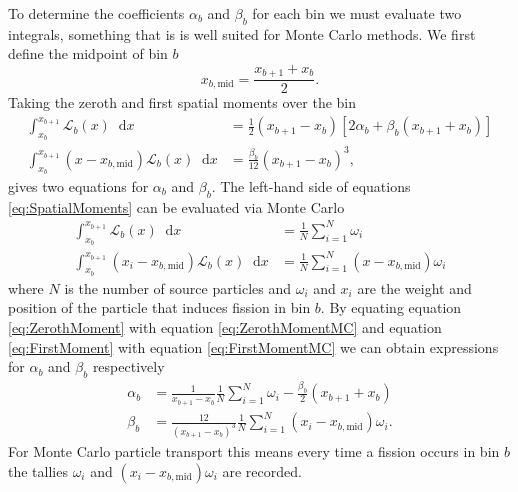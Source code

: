 \documentclass[12]{ansnse}
\newcommand{\dd}{\ensuremath{\mathop{}\!\mathrm{d}}}
\newcommand{\Lx}{\ensuremath{\Lin_b(x)}}
\newcommand{\Lin}{\ensuremath{\mathcal{L}}}
\newcommand{\xmid}{\ensuremath{x_{b,\mathrm{mid}}}}
\begin{document}
\begin{doublespace}
To determine the coefficients $\alpha_b$ and $\beta_b$ for each bin we must evaluate two integrals, something that is is well suited for Monte Carlo methods.  We first define the midpoint of bin $b$
\begin{equation}
    \xmid = \frac{x_{b+1}+x_b}{2}.
    \label{eq:xmid}
\end{equation}
Taking the zeroth and first spatial moments over the bin
\begin{subequations}
    \begin{align}
        \int_{x_b}^{x_{b+1}} \Lx \dd x &= \frac{1}{2}\left(x_{b+1} - x_b\right)\left[2\alpha_b + \beta_b\left(x_{b+1} + x_b\right)\right] \label{eq:ZerothMoment} \\
        \int_{x_b}^{x_{b+1}} \left(x-\xmid\right)\Lx \dd x &= \frac{\beta_b}{12}\left(x_{b+1} - x_b\right)^3, \label{eq:FirstMoment}
    \end{align}
        \label{eq:SpatialMoments}
\end{subequations}
gives two equations for $\alpha_b$ and $\beta_b$.  The left-hand side of equations \ref{eq:SpatialMoments} can be evaluated via Monte Carlo
\begin{subequations}\label{eq:SpatialMomentsMC}
    \begin{align}
        \int_{x_b}^{x_{b+1}} \Lx \dd x &= \frac{1}{N}\sum_{i=1}^N \omega_i  \label{eq:ZerothMomentMC} \\
        \int_{x_b}^{x_{b+1}} \left(x_i-\xmid\right)\Lx \dd x &= \frac{1}{N}\sum_{i=1}^N \left(x-\xmid\right)\omega_i \label{eq:FirstMomentMC}
    \end{align}
\end{subequations}
where $N$ is the number of source particles and $\omega_i$ and $x_i$ are the weight and position of the particle that induces fission in bin $b$.  By equating equation \ref{eq:ZerothMoment} with equation \ref{eq:ZerothMomentMC} and equation \ref{eq:FirstMoment} with equation \ref{eq:FirstMomentMC} we can obtain expressions for $\alpha_b$ and $\beta_b$ respectively
\begin{subequations}
    \begin{align}
        \alpha_b &= \frac{1}{x_{b+1}-x_b}\frac{1}{N} \sum_{i=1}^N \omega_i - \frac{\beta_b}{2}\left(x_{b+1}+x_b\right) \label{eq:alpha_b} \\
        \beta_b &= \frac{12}{\left(x_{b+1}-x_b\right)^3}\frac{1}{N} \sum_{i=1}^N \left(x_i-\xmid\right)\omega_i. \label{eq:beta_b}
    \end{align}
    \label{eq:ExpansionCoefficients}
\end{subequations}
For Monte Carlo particle transport this means every time a fission occurs in bin $b$ the tallies $\omega_i$ and  $\left(x_i - \xmid\right)\omega_i$ are recorded.  


\end{doublespace}
\end{document}
